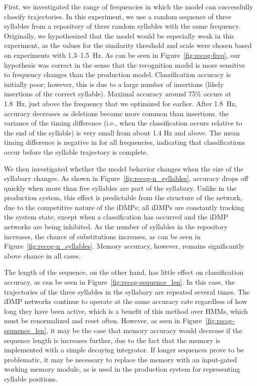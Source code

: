 First, we investigated the
range of frequencies in which the model
can successfully classify trajectories.
In this experiment, we use a random sequence
of three syllables from a
repository of three random syllables
with the same frequency.
Originally, we hypothesized that the
model would be especially weak in this experiment,
as the values for the similarity threshold
and scale were chosen based on
experiments with 1.3--1.5~Hz.
As can be seen in Figure~\ref{fig:recog-freq},
our hypothesis was correct in the sense that
the recognition model
is more sensitive to frequency changes
than the production model.
Classification accuracy is initially poor;
however, this is due to a large number
of insertions
(likely insertions of the correct syllable).
Maximal accuracy around 75\%
occurs at 1.8~Hz,
just above the frequency that we
optimized for earlier.
After 1.8~Hz, accuracy decreases
as deletions become more common
than insertions.
the variance of the timing difference
(i.e., when the classification occurs
relative to the end of the syllable)
is very small from about 1.4 Hz and above.
The mean timing difference
is negative in for all frequencies,
indicating that classifications
occur before the syllable trajectory
is complete.


We then investigated whether the model
behavior changes when the size
of the syllabary changes.
As shown in Figure~\ref{fig:recog-n_syllables},
accuracy drops off quickly when
more than five syllables
are part of the syllabary.
Unlike in the production system,
this effect is predictable
from the structure of the network,
due to the competitive nature
of the iDMPs;
all iDMPs are constantly tracking
the system state,
except when a classification has occurred
and the iDMP networks are being inhibited.
As the number of syllables in the repository increases,
the chance of substitutions increases,
as can be seen in Figure~\ref{fig:recog-n_syllables}.
Memory accuracy, however, remains significantly
above chance in all cases.


The length of the sequence,
on the other hand,
has little effect on classification accuracy,
as can be seen in Figure~\ref{fig:recog-sequence_len}.
In this case, the trajectories
of the three syllables in the syllabary
are repeated several times.
The iDMP networks continue to operate
at the same accuracy rate
regardless of how long they have been active,
which is a benefit of this method
over HMMs, which must be renormalized
and reset often.
However, as seen in Figure~\ref{fig:recog-sequence_len},
it may be the case that memory accuracy
would decrease if the sequence length
is increases further,
due to the fact that the memory
is implemented with a simple decaying integrator.
If longer sequences prove to be problematic,
it may be necessary to replace the memory
with an input-gated working memory module,
as is used in the production system
for representing syllable positions.

